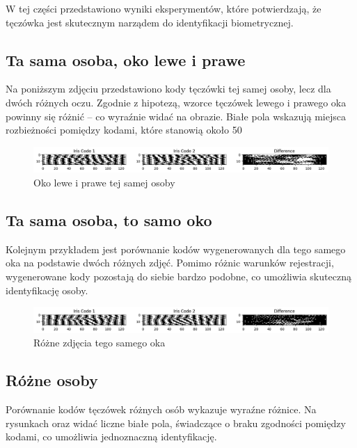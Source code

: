 \documentclass[a4paper]{article}
\begin{document}
W tej części przedstawiono wyniki eksperymentów, które potwierdzają, że tęczówka jest skutecznym narządem do identyfikacji biometrycznej.

\subsection*{Ta sama osoba, oko lewe i prawe}

Na poniższym zdjęciu przedstawiono kody tęczówki tej samej osoby, lecz dla dwóch różnych oczu. Zgodnie z hipotezą, wzorce tęczówek lewego i prawego oka powinny się różnić – co wyraźnie widać na obrazie. Białe pola wskazują miejsca rozbieżności pomiędzy kodami, które stanowią około 50

\begin{figure}[H]
    \centering
    \includegraphics[width=0.75\linewidth]{figures/ta_sama_osoba_lewe_i_prawe.png}
    \caption{Oko lewe i prawe tej samej osoby}
\end{figure}

\subsection*{Ta sama osoba, to samo oko}

Kolejnym przykładem jest porównanie kodów wygenerowanych dla tego samego oka na podstawie dwóch różnych zdjęć. Pomimo różnic warunków rejestracji, wygenerowane kody pozostają do siebie bardzo podobne, co umożliwia skuteczną identyfikację osoby.

\begin{figure}[H]
    \centering
    \includegraphics[width=0.75\linewidth]{figures/ta_sama_osoba_to_samo_oko.png}
    \caption{Różne zdjęcia tego samego oka}
\end{figure}

\subsection*{Różne osoby}

Porównanie kodów tęczówek różnych osób wykazuje wyraźne różnice. Na rysunkach  oraz  widać liczne białe pola, świadczące o braku zgodności pomiędzy kodami, co umożliwia jednoznaczną identyfikację.
\end{document}
